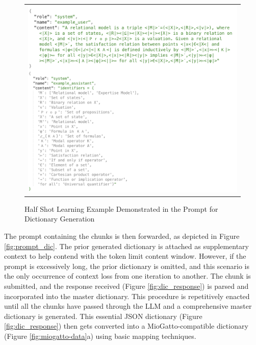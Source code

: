 \begin{figure}[htpb]
  \centering
  \begin{tabular}{c}
  \includegraphics[width=14cm]{images/Prompt_dict_example.png}
  \end{tabular}
  \caption{Half Shot Learning Example Demonstrated in the Prompt for Dictionary Generation}\label{fig:prompt_dic_example}
\end{figure}

The prompt containing the chunks is then forwarded, as depicted in Figure \ref{fig:prompt_dic}. The prior generated dictionary is attached as supplementary context to help contend with the token limit content window. However, if the prompt is excessively long, the prior dictionary is omitted, and this scenario is the only occurrence of context loss from one iteration to another. The chunk is submitted, and the response received (Figure \ref{fig:dic_response}) is parsed and incorporated into the master dictionary. This procedure is repetitively enacted until all the chunks have passed through the LLM and a comprehensive master dictionary is generated. This essential JSON dictionary (Figure \ref{fig:dic_response}) then gets converted into a MioGatto-compatible dictionary (Figure \ref{fig:miogatto-data}a) using basic mapping techniques.


